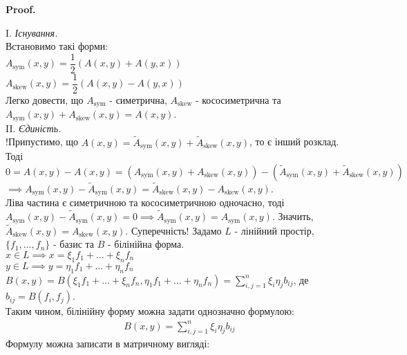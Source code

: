 \documentclass[a4paper, 10pt]{article}
\makeatletter
\theoremstyle{theoremdd}
\renewenvironment{proof}[1][Proof.\\]{\par
\pushQED{\hfill \qed}%
\normalfont \topsep6\p@\@plus6\p@\relax
\trivlist
\item\relax
{\bfseries
#1\@addpunct{.}}\hspace\labelsep\ignorespaces
}{%
\popQED\endtrivlist\@endpefalse
}
\makeatother
\begin{document}
\begin{proof}
I. \textit{Існування.}\\
Встановимо такі форми: \\
$A_{\text{sym}}(x,y) = \dfrac{1}{2} \left( A(x,y) + A(y,x) \right)$ \\
$A_{\text{skew}}(x,y) = \dfrac{1}{2} \left( A(x,y) - A(y,x) \right)$ \\
Легко довести, що $A_{\text{sym}}$ - симетрична, $A_{\text{skew}}$ - кососиметрична та $A_{\text{sym}}(x,y) + A_{\text{skew}}(x,y) = A(x,y)$.
\bigskip \\
II. \textit{Єдиність.}\\
!Припустимо, що $A(x,y) = \tilde{A}_{\text{sym}}(x,y) + \tilde{A}_{\text{skew}}(x,y)$, то є інший розклад. Тоді\\
$0 = A(x,y) - A(x,y) = (A_{\text{sym}}(x,y) + A_{\text{skew}}(x,y)) - (\tilde{A}_{\text{sym}}(x,y) + \tilde{A}_{\text{skew}}(x,y))$\\
$\implies A_{\text{sym}}(x,y) - \tilde{A}_{\text{sym}}(x,y) = \tilde{A}_{\text{skew}}(x,y) - A_{\text{skew}}(x,y)$.\\
Ліва частина є симетричною та кососиметричною одночасно, тоді $A_{\text{sym}}(x,y) - \tilde{A}_{\text{sym}}(x,y) = 0 \implies \tilde{A}_{\text{sym}}(x,y) = A_{\text{sym}}(x,y)$. Значить, $\tilde{A}_{\text{skew}}(x,y) = A_{\text{skew}}(x,y)$. Суперечність!
\end{proof}
\noindent
Задамо $L$ - лінійний простір, $\{f_1,\dots,f_n\}$ - базис та $B$ - білінійна форма.\\
$x \in L \implies x = \xi_1 f_1 + \dots + \xi_n f_n$\\
$y \in L \implies y = \eta_1 f_1 + \dots + \eta_n f_n$\\
$B(x,y) = B(\xi_1 f_1 + \dots + \xi_n f_n, \eta_1 f_1 + \dots + \eta_n f_n) = \displaystyle\sum_{i,j=1}^n \xi_i \eta_j b_{ij}$, де $b_{ij} = B(f_i,f_j)$.\\
Таким чином, білінійну форму можна задати однозначно формулою:
\begin{align*}
B(x,y) = \sum_{i,j=1}^n \xi_i \eta_j b_{ij}
\end{align*}
Формулу можна записати в матричному вигляді:\\
\end{document}
